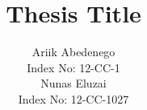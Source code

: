 \documentclass[12pt]{gatechthesis}
\title{Thesis Title}
\author{{Ariik Abedenego\\ Index No: 12-CC-1}
	\vspace*{0.5cm} \\{Nunas Eluzai\\ Index No: 12-CC-1027}}
\begin{document}



\begin{frontmatter}
    
    \makeTOC
    \makeListOfTables
    \makeListOfFigures
    
    
\end{frontmatter}

\begin{thesisbody}
    
    
    
    
    
    
    \makeBibliography
\end{thesisbody}
\end{document}
